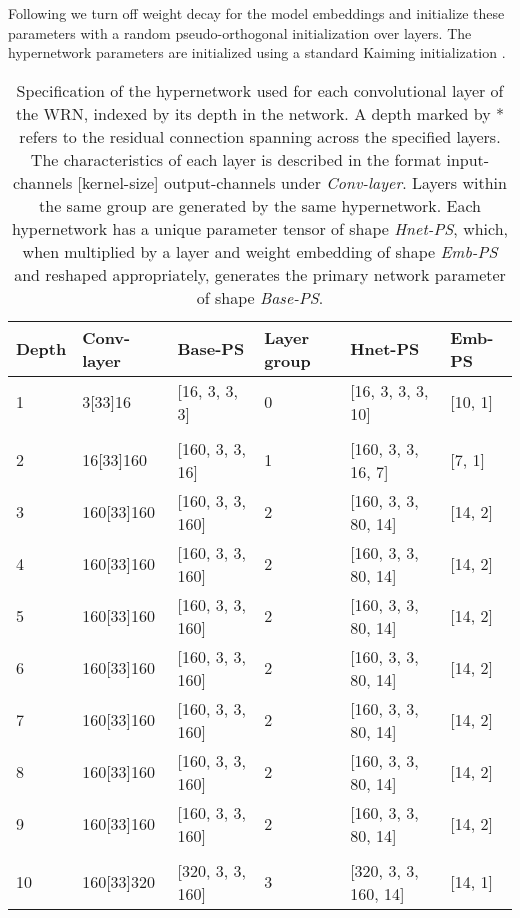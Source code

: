 \documentclass{article} \usepackage{iclr2021_conference,times}
\begin{document}
Following \citet{savarese_learning_2019} we turn off weight decay for the model embeddings and initialize these parameters with a random pseudo-orthogonal initialization over layers. The hypernetwork parameters are initialized using a standard Kaiming initialization \citep{he_delving_2015}.

\begin{table}[htbp!]
  \caption{Specification of the hypernetwork used for each convolutional layer of the WRN, indexed by its depth in the network. A depth marked by * refers to the residual connection spanning across the specified layers. The characteristics of each layer is described in the format input-channels  [kernel-size]  output-channels under \emph{Conv-layer}. Layers within the same group are generated by the same hypernetwork. Each hypernetwork has a unique parameter tensor of shape \emph{Hnet-PS}, which, when multiplied by a layer and weight embedding of shape \emph{Emb-PS} and reshaped appropriately, generates the primary network parameter of shape \emph{Base-PS}.}
  \label{tab:hnet-spec}
 \centering
  {\renewcommand{\arraystretch}{1.1}\setlength{\tabcolsep}{5pt}
  \begin{tabular}{@{}llllll@{}}
  \toprule
Depth & Conv-layer & Base-PS & Layer group & Hnet-PS & Emb-PS \\ 
 \midrule
1 & 3[33]16 & [16, 3, 3, 3] & 0 & [16, 3, 3, 3, 10] & [10, 1] \\ 
 &  &  &  &  &  \\ 
2 & 16[33]160 & [160, 3, 3, 16] & 1 & [160, 3, 3, 16, 7] & [7, 1] \\ 
3 & 160[33]160 & [160, 3, 3, 160] & 2 & [160, 3, 3, 80, 14] & [14, 2] \\ 
4 & 160[33]160 & [160, 3, 3, 160] & 2 & [160, 3, 3, 80, 14] & [14, 2] \\ 
5 & 160[33]160 & [160, 3, 3, 160] & 2 & [160, 3, 3, 80, 14] & [14, 2] \\ 
6 & 160[33]160 & [160, 3, 3, 160] & 2 & [160, 3, 3, 80, 14] & [14, 2] \\ 
7 & 160[33]160 & [160, 3, 3, 160] & 2 & [160, 3, 3, 80, 14] & [14, 2] \\ 
8 & 160[33]160 & [160, 3, 3, 160] & 2 & [160, 3, 3, 80, 14] & [14, 2] \\ 
9 & 160[33]160 & [160, 3, 3, 160] & 2 & [160, 3, 3, 80, 14] & [14, 2] \\ 
 &  &  &  &  &  \\ 
10 & 160[33]320 & [320, 3, 3, 160] & 3 & [320, 3, 3, 160, 14] & [14, 1] \\ 

\end{tabular}}
\end{table}
\end{document}
